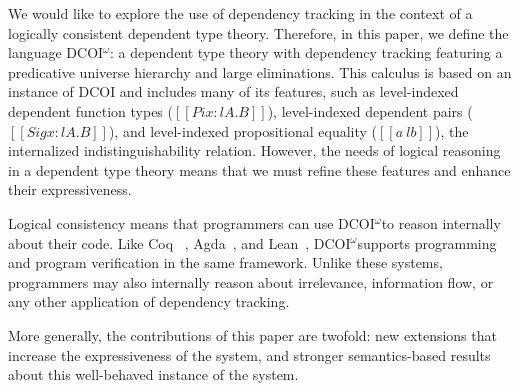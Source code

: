 \documentclass[acmsmall]{acmart}
\makeatletter
\theoremstyle{linked}
\theoremstyle{deflinked}
\theoremstyle{acmdefinition}
\newcommand{\dcoi}{DCOI\@\xspace}
\newcommand{\name}{\texorpdfstring{DCOI$^{\omega}$\@\xspace}{DCOI-omega}}
\makeatother
\begin{document}
We would like to explore the use of dependency tracking in the context of a
logically consistent dependent type theory.  Therefore, in this paper, we
define the language \name: a dependent type theory with dependency tracking
featuring a predicative universe hierarchy and large eliminations.  This
calculus is based on an instance of \dcoi and includes many of its features,
such as level-indexed dependent function types ($[[Pi x : l A . B]]$),
level-indexed dependent pairs ($[[Sig x : l A. B]]$), and level-indexed
propositional equality ($[[a ~l b]]$), the internalized indistinguishability
relation. However, the needs of logical reasoning in a dependent type theory
means that we must refine these features and enhance their expressiveness.

Logical consistency means that programmers can use \name to reason internally
about their code. Like Coq ~\citep{coq}, Agda~\citep{agda}, and
Lean~\citep{lean}, \name supports programming and program verification in the
same framework. Unlike these systems, programmers may also internally reason
about irrelevance, information flow, or any other application of dependency
tracking.

More generally, the contributions of this paper are twofold: new extensions
that increase the expressiveness of the system, and stronger semantics-based
results about this well-behaved instance of the system.
\end{document}
